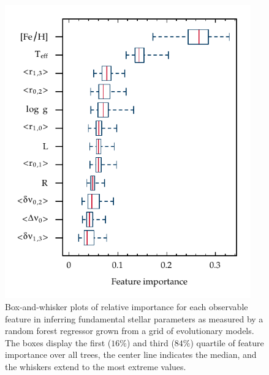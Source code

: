 \begin{figure}
    \centering
    \includegraphics[width=300.887892pt,%
    keepaspectratio,natwidth=251,natheight=300]{importances-perturb.pdf}
    \caption[Feature Importances]{Box-and-whisker plots of relative importance for each observable feature in inferring fundamental stellar parameters as measured by a random forest regressor grown from a grid of evolutionary models. The boxes display the first ($16\%$) and third ($84\%$) quartile of feature importance over all trees, the center line indicates the median, and the whiskers extend to the most extreme values.}
    \label{fig:importances}
\end{figure}

